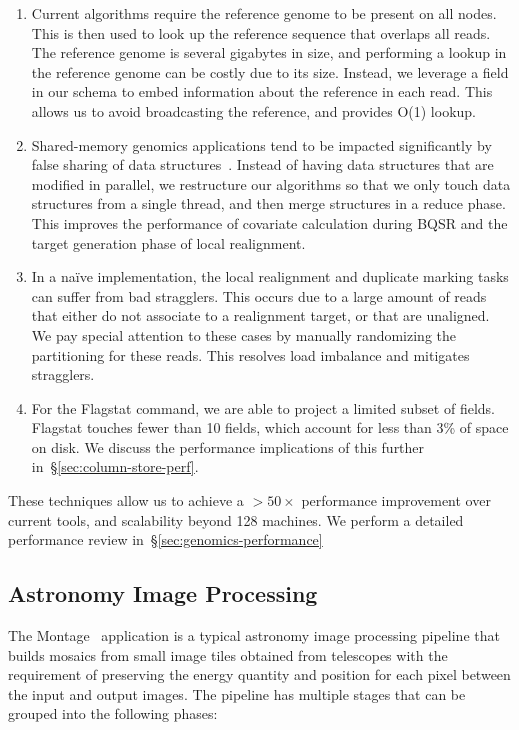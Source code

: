 \documentclass{acm_proc_article-sp}
\begin{document}
\begin{enumerate}
\item Current algorithms require the reference genome to be present on all nodes. This is then used to
look up the reference sequence that overlaps all reads. The reference genome is several gigabytes in
size, and performing a lookup in the reference genome can be costly due to its size. Instead, we leverage
a field in our schema to embed information about the reference in each read. This allows us to avoid
broadcasting the reference, and provides O(1) lookup.
\item Shared-memory genomics applications tend to be impacted significantly by false sharing of data
\linebreak structures~\cite{zaharia11}. Instead of having data structures that are modified in parallel, we
restructure our algorithms so that we only touch data structures from a single thread, and then merge
structures in a reduce phase. This improves the performance of covariate calculation during BQSR and
the target generation phase of local realignment.
\item In a na\"{i}ve implementation, the local realignment and duplicate marking tasks can suffer from bad
stragglers. This occurs due to a large amount of reads that either do not associate to a realignment
target, or that are unaligned. We pay special attention to these cases by manually randomizing the
partitioning for these reads. This resolves load imbalance and mitigates stragglers.
\item For the Flagstat command, we are able to project a limited subset of fields. Flagstat touches fewer
than 10 fields, which account for less than 3\% of space on disk. We discuss the performance
implications of this further in~\S\ref{sec:column-store-perf}.
\end{enumerate}

These techniques allow us to achieve a $>50\times$ performance improvement over current tools, and
scalability beyond 128 machines. We perform a detailed performance review
in~\S\ref{sec:genomics-performance}

\subsection{Astronomy Image Processing}
\label{sec:astronomy-image-processing}

The Montage~\cite{montage} application is a typical astronomy image processing pipeline that builds
mosaics from small image tiles obtained from telescopes with the requirement of preserving the energy
quantity and position for each pixel between the input and output images. The pipeline has multiple
stages that can be grouped into the following phases:
\end{document}
